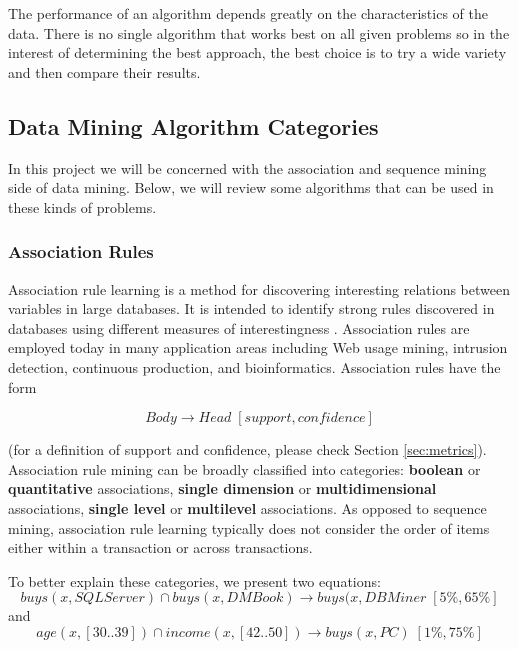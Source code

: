 The performance of an algorithm depends greatly on the characteristics of the data. There is no single algorithm that works best on all given problems \cite{wolpert1995no} so in the interest of determining the best approach, the best choice is to try a wide variety and then compare their results.

\subsection{Data Mining Algorithm Categories}\label{sec:dmalgorithms}
In this project we will be concerned with the association and sequence mining side of data mining. Below, we will review some algorithms that can be used in these kinds of problems.

\subsubsection{Association Rules}
Association rule learning is a method for discovering interesting relations between variables in large databases. It is intended to identify strong rules discovered in databases using different measures of interestingness \cite{han2006data}. Association rules are employed today in many application areas including Web usage mining, intrusion detection, continuous production, and bioinformatics. Association rules have the form 

\begin{equation}Body \rightarrow Head\;[support, confidence]\end{equation} 

(for a definition of support and confidence, please check Section \ref{sec:metrics}). Association rule mining can be broadly classified into categories: \textbf{boolean} or \textbf{quantitative} associations, \textbf{single dimension} or \textbf{multidimensional} associations, \textbf{single level} or \textbf{multilevel} associations. As opposed to sequence mining, association rule learning typically does not consider the order of items either within a transaction or across transactions. 

To better explain these categories, we present two equations: 
\begin{equation}\label{eq:eq1} buys(x, SQLServer) \cap buys(x, DMBook) \rightarrow buys(x, DBMiner\;[5\%, 65\%]\end{equation} and 
\begin{equation}\label{eq:eq2} age(x, [30..39]) \cap income(x, [42..50]) \rightarrow buys(x, PC)\;[1\%, 75\%]\end{equation}


